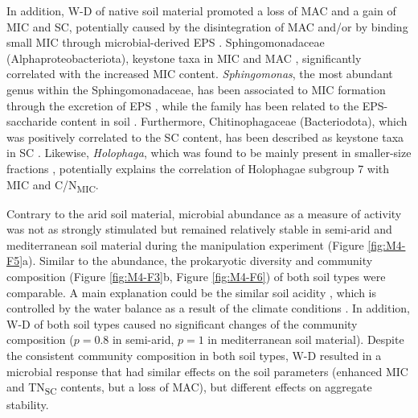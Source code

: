 In addition, W-D of native soil material promoted a loss of MAC and a gain of MIC and SC, potentially caused by the disintegration of MAC and/or by binding small MIC through microbial-derived EPS \citep{Six2004, Totsche2018}. Sphingomonadaceae (Alphaproteobacteriota), keystone taxa in MIC and MAC \citep{Feng2022}, significantly correlated with the increased MIC content. \textit{Sphingomonas}, the most abundant genus within the Sphingomonadaceae, has been associated to MIC formation through the excretion of EPS \citep{Pankratov2007, Vuko2020}, while the family has been related to the EPS-saccharide content in soil \citep{Bettermann2021}. Furthermore, Chitinophagaceae (Bacteriodota), which was positively correlated to the SC content, has been described as keystone taxa in SC \citep{Feng2022}. Likewise, \textit{Holophaga}, which was found to be mainly present in smaller-size fractions \citep{Sessitsch2001}, potentially explains the correlation of Holophagae subgroup 7 with MIC and C/N\textsubscript{MIC}.

Contrary to the arid soil material, microbial abundance as a measure of activity was not as strongly stimulated but remained relatively stable in semi-arid and mediterranean soil material during the manipulation experiment (Figure \ref{fig:M4-F5}a). Similar to the abundance, the prokaryotic diversity and community composition (Figure \ref{fig:M4-F3}b, Figure \ref{fig:M4-F6}) of both soil types were comparable. A main explanation could be the similar soil acidity \citep{Bernhard2018}, which is controlled by the water balance as a result of the climate conditions \citep{Slessarev2016}. In addition, W-D of both soil types caused no significant changes of the community composition (\(p = 0.8\) in semi-arid, \(p = 1\) in mediterranean soil material). Despite the consistent community composition in both soil types, W-D resulted in a microbial response that had similar effects on the soil parameters (enhanced MIC and TN\textsubscript{SC} contents, but a loss of MAC), but different effects on aggregate stability.

